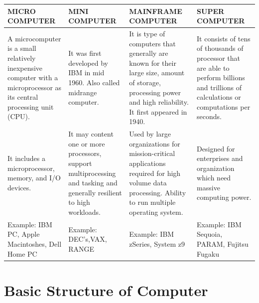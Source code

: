 \documentclass[british]{extreport}
\providecommand{\tabularnewline}{\\}
\begin{document}
\medskip{}

\begin{center}
	\begin{tabular}{|>{\raggedright}m{40mm}|>{\raggedright}m{40mm}|>{\raggedright}m{40mm}|>{\raggedright}m{40mm}|}
		\hline
		\textbf{MICRO COMPUTER}                                & \textbf{MINI COMPUTER}                                                    & \textbf{MAINFRAME COMPUTER}                                            & \textbf{SUPER COMPUTER}\tabularnewline
		\hline
		\hline
		A microcomputer is a small relatively inexpensive computer with a
		microprocessor as its central processing unit (CPU).   & It was first developed by IBM in mid 1960. Also called midrange computer. & It is type of computers that generally are known for their large size,
		amount of storage, processing power and high reliability. It first
		appeared in 1940.                                      & It consists of tens of thousands of processor that are able to perform
		billions and trillions of calculations or computations per seconds.\tabularnewline
		\hline
		It includes a microprocessor, memory, and I/O devices. & It may content one or more processors, support multiprocessing and
		tasking and generally resilient to high workloads.     & Used by large organizations for mission-critical applications required
		for high volume data processing. Ability to run multiple operating
		system.                                                & Designed for enterprises and organization which need massive computing
		power.\tabularnewline
		\hline
		Example: IBM PC, Apple Macintoshes, Dell Home PC       & Example: DEC\textquoteright s,VAX, RANGE                                  & Example: IBM zSeries, System z9                                        & Example: IBM Sequoia, PARAM, Fujitsu Fugaku\tabularnewline
		\hline
	\end{tabular}
	\par\end{center}

\chapter{Basic Structure of Computer}

\pagebreak{}
\end{document}

